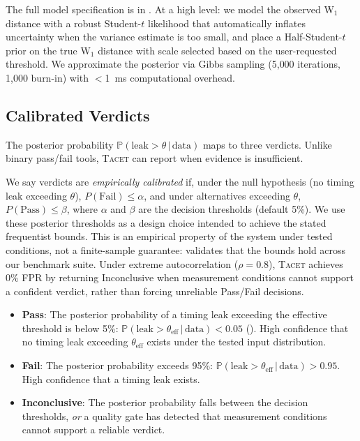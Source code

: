 \documentclass[letterpaper,twocolumn,10pt]{article}
\newcommand{\tacet}{\textsc{Tacet}\xspace}
\newcommand{\prob}[1]{\mathbb{P}(#1)}
\newcommand{\given}{\,|\,}
\newcommand{\ms}[1]{\SI{#1}{\milli\second}}
\begin{document}
The full model specification is in . At a high
level: we model the observed W$_1$ distance with a robust Student-$t$ likelihood
that automatically inflates uncertainty when the variance estimate is too small,
and place a Half-Student-$t$ prior on the true W$_1$ distance with scale selected
based on the user-requested threshold. We approximate the posterior via Gibbs sampling
(5{,}000 iterations, 1{,}000 burn-in) with $<$\ms{1} computational overhead.

\subsection{Calibrated Verdicts}
\label{sec:approach:decisions}

The posterior probability $\prob{\text{leak} > \theta \given \text{data}}$ maps to
three verdicts. Unlike binary pass/fail tools, \tacet can report when evidence is
insufficient.

We say verdicts are \emph{empirically calibrated} if, under the null hypothesis
(no timing leak exceeding $\theta$), $P(\text{Fail}) \leq \alpha$,
and under alternatives exceeding $\theta$, $P(\text{Pass}) \leq \beta$,
where $\alpha$ and $\beta$ are the decision thresholds (default 5\%).
We use these posterior thresholds as a design choice intended to achieve
the stated frequentist bounds. This is an empirical property of the
system under tested conditions, not a finite-sample guarantee:
 validates that the bounds hold across
our benchmark suite. Under extreme autocorrelation ($\rho = 0.8$),
\tacet achieves 0\% FPR by returning Inconclusive when measurement
conditions cannot support a confident verdict, rather than forcing
unreliable Pass/Fail decisions.

\begin{itemize}
    \item \textbf{Pass}: The posterior probability of a timing leak exceeding
          the effective threshold is below 5\%: $\prob{\text{leak} > \theta_{\text{eff}} \given \text{data}} < 0.05$
          ().
          High confidence that no timing leak exceeding $\theta_{\text{eff}}$ exists under the tested
          input distribution.

    \item \textbf{Fail}: The posterior probability exceeds 95\%:
          $\prob{\text{leak} > \theta_{\text{eff}} \given \text{data}} > 0.95$.
          High confidence that a timing leak exists.

    \item \textbf{Inconclusive}: The posterior probability falls between the
          decision thresholds, \emph{or} a quality gate has detected that
          measurement conditions cannot support a reliable verdict.
\end{itemize}
\end{document}
